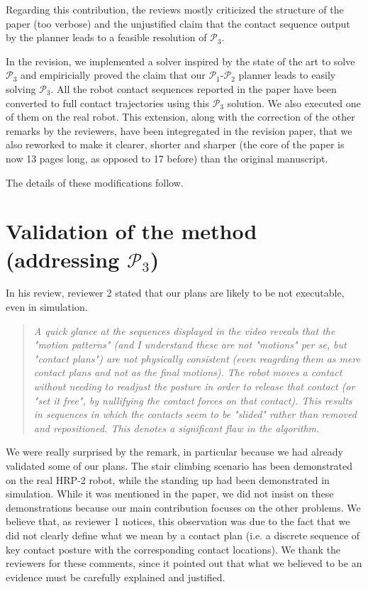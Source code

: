 \documentclass[a4paper]{article}
\begin{document}
Regarding this contribution, the reviews mostly criticized the structure of the paper (too verbose) and the unjustified claim that the contact sequence output by the planner leads to a feasible resolution of $\mathcal{P}_3$.

In the revision, we implemented a solver inspired by the state of the art to solve $\mathcal{P}_3$ and empiricially proved the claim that our $\mathcal{P}_1$-$\mathcal{P}_2$ planner leads to easily solving $\mathcal{P}_3$. 
All the robot contact sequences reported in the paper have been converted to full contact trajectories using this $\mathcal{P}_3$ solution.
We also executed one of them on the real robot.
This extension, along with the correction of the other remarks by the reviewers, have been integregated in the revision paper, that we also reworked to make it clearer, shorter and sharper (the core of the paper is now 13 pages long, as opposed to 17 before) than the original manuscript.

The details of these modifications follow.

\section{Validation of the method (addressing  $\mathcal{P}_3$) }
In his review, reviewer 2 stated that our plans are likely to be not executable, even in simulation.

\begin{quote}
  \textit{A quick glance at the sequences displayed in the video reveals that the "motion patterns" (and I understand these are not "motions" per se, but "contact plans") are not physically consistent (even reagrding them as mere contact plans and not as the final motions). The robot moves a contact without needing to readjust the posture in order to release that contact (or "set it free", by nullifying the contact forces on that contact). This results in sequences in which the contacts seem to be "slided" rather than removed and repositioned. This denotes a significant flaw in the algorithm.   }
\end{quote}

We were really surprised by the remark, in particular because we had already validated some of our plans.
The stair climbing scenario has been demonstrated on the real HRP-2 robot, while the standing up had been demonstrated in simulation. 
While it was mentioned in the paper, we did not insist on these demonstrations because our main contribution focuses on the other problems. 
We believe that, as reviewer 1 notices, this observation was due to the fact that we did not clearly define what we mean by a contact plan (i.e. a discrete sequence of key contact posture with the corresponding contact locations).
We thank the reviewers for these comments, since it pointed out that what we believed to be an evidence must be carefully explained and justified.
\end{document}
